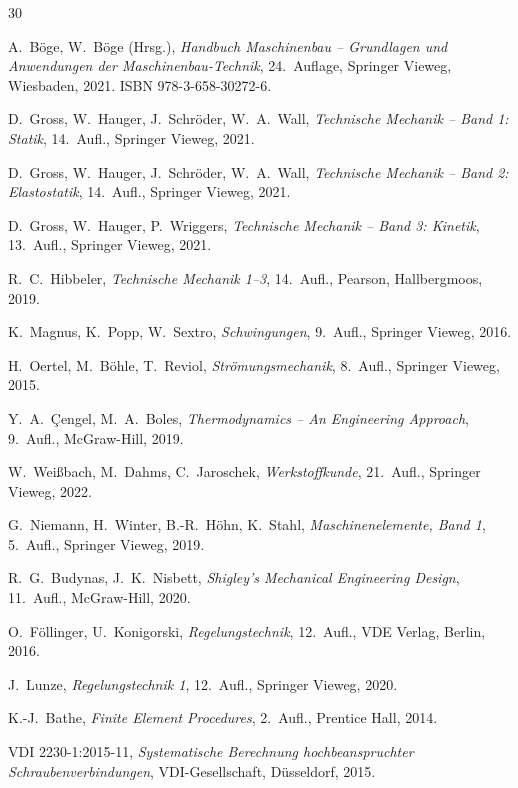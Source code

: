 ﻿\documentclass[a4paper,12pt]{report}
\theoremstyle{definition}
\begin{document}
\begin{thebibliography}{30}

A.~B\"oge, W.~B\"oge (Hrsg.),
\textit{Handbuch Maschinenbau -- Grundlagen und Anwendungen der Maschinenbau-Technik},
24.~Auflage, Springer Vieweg, Wiesbaden, 2021. ISBN 978-3-658-30272-6.

D.~Gross, W.~Hauger, J.~Schr\"oder, W.~A.~Wall,
\textit{Technische Mechanik -- Band 1: Statik}, 14.~Aufl., Springer Vieweg, 2021.

D.~Gross, W.~Hauger, J.~Schr\"oder, W.~A.~Wall,
\textit{Technische Mechanik -- Band 2: Elastostatik}, 14.~Aufl., Springer Vieweg, 2021.

D.~Gross, W.~Hauger, P.~Wriggers,
\textit{Technische Mechanik -- Band 3: Kinetik}, 13.~Aufl., Springer Vieweg, 2021.

R.~C.~Hibbeler,
\textit{Technische Mechanik 1--3}, 14.~Aufl., Pearson, Hallbergmoos, 2019.

K.~Magnus, K.~Popp, W.~Sextro,
\textit{Schwingungen}, 9.~Aufl., Springer Vieweg, 2016.

H.~Oertel, M.~B\"ohle, T.~Reviol,
\textit{Str\"omungsmechanik}, 8.~Aufl., Springer Vieweg, 2015.

Y.~A.~\c{C}engel, M.~A.~Boles,
\textit{Thermodynamics -- An Engineering Approach}, 9.~Aufl., McGraw-Hill, 2019.

W.~Wei\ss{}bach, M.~Dahms, C.~Jaroschek,
\textit{Werkstoffkunde}, 21.~Aufl., Springer Vieweg, 2022.

G.~Niemann, H.~Winter, B.-R.~H\"ohn, K.~Stahl,
\textit{Maschinenelemente, Band 1}, 5.~Aufl., Springer Vieweg, 2019.

R.~G.~Budynas, J.~K.~Nisbett,
\textit{Shigley's Mechanical Engineering Design}, 11.~Aufl., McGraw-Hill, 2020.

O.~F\"ollinger, U.~Konigorski,
\textit{Regelungstechnik}, 12.~Aufl., VDE Verlag, Berlin, 2016.

J.~Lunze,
\textit{Regelungstechnik 1}, 12.~Aufl., Springer Vieweg, 2020.

K.-J.~Bathe,
\textit{Finite Element Procedures}, 2.~Aufl., Prentice Hall, 2014.

VDI 2230-1:2015-11,
\textit{Systematische Berechnung hochbeanspruchter Schraubenverbindungen},
VDI-Gesellschaft, D\"usseldorf, 2015.


\end{thebibliography}
\end{document}
